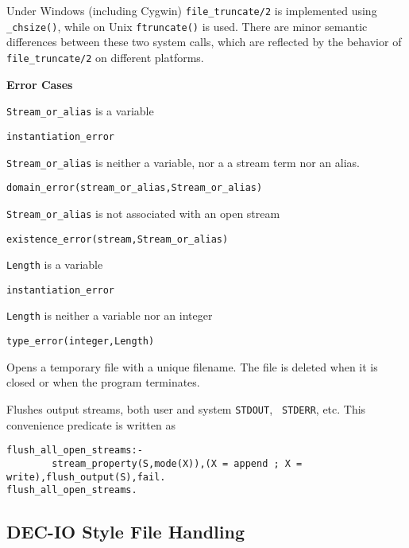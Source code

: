 \begin{description}
\portability Under Windows (including Cygwin) {\tt file\_truncate/2}
is implemented using {\tt \_chsize()}, while on Unix {\tt ftruncate()}
is used.  There are minor semantic differences between these two
system calls, which are reflected by the behavior of {\tt
file\_truncate/2} on different platforms.

{\bf Error Cases}
\bi
\item 	{\tt Stream\_or\_alias} is a variable
\bi
\item {\tt instantiation\_error}
\ei
\item {\tt Stream\_or\_alias} is neither a variable, nor a a stream
  term nor an alias.  
\bi
\item 	{\tt domain\_error(stream\_or\_alias,Stream\_or\_alias)}
\ei
\item 	{\tt Stream\_or\_alias} is not associated with an open stream
\bi
\item 	{\tt existence\_error(stream,Stream\_or\_alias)}
\ei
\item {\tt Length} is a variable
\bi
\item {\tt instantiation\_error}
\ei
\item {\tt Length} is neither a variable nor an integer
\bi
\item 	{\tt type\_error(integer,Length)}
\ei
\ei
{}

    Opens a temporary file with a unique filename. The file is deleted
    when it is closed or when the program terminates.

%
Flushes output streams, both user and system {\tt STDOUT}, {\tt
  STDERR}, etc.  This convenience predicate is written as
%
\begin{verbatim}
flush_all_open_streams:- 
        stream_property(S,mode(X)),(X = append ; X = write),flush_output(S),fail.
flush_all_open_streams.
\end{verbatim}

\end{description}

\subsection{DEC-IO Style File Handling}

